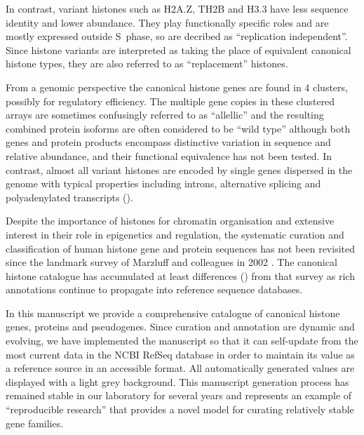 	In contrast, variant histones such as H2A.Z, TH2B and H3.3 have 
	less sequence identity and lower abundance. 
	They play functionally specific roles and are mostly expressed outside S~phase, 
	so are decribed as ``replication independent''. 
	Since histone variants are interpreted as taking the place of equivalent canonical histone types, 
	they are also referred to as ``replacement'' histones.

	From a genomic perspective the canonical histone genes are found in 4 clusters, 
	possibly for regulatory efficiency. 
	The multiple gene copies in these clustered arrays are sometimes confusingly referred to as ``allellic'' 
	and the resulting combined protein isoforms are often considered to be ``wild type'' 
	although both genes and protein products encompass distinctive variation in sequence and relative abundance, 
	and their functional equivalence has not been tested.
	In contrast, almost all variant histones are encoded by single genes dispersed in the genome 
	with typical properties including introns, alternative splicing 
	and polyadenylated transcripts ().

	Despite the importance of histones for chromatin organisation and extensive interest
	in their role in epigenetics and regulation, the systematic curation and classification of human histone
	gene and protein sequences has not been revisited 
	since the landmark survey of Marzluff and colleagues in 2002 \citep{Marzluff02}. 
	The canonical histone catalogue has accumulated at least 
	 differences ()
	from that survey as rich annotations continue to propagate into reference sequence databases.

	In this manuscript we provide a comprehensive catalogue
	of canonical histone genes, proteins and pseudogenes.
	Since curation and annotation are dynamic and evolving,
	we have implemented the manuscript so that it can 
	self-update from the most current data in the NCBI RefSeq database 
	in order to maintain its value as a reference source in an accessible format.
	All automatically generated values are displayed with a light grey background.
	This manuscript generation process has remained stable in our laboratory for several years
	and represents an example of ``reproducible research'' \citep{Claerbout2000}
	that provides a novel model for curating relatively stable gene families.

